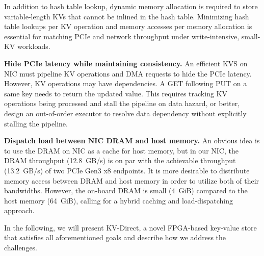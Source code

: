 In addition to hash table lookup, dynamic memory allocation is required to store variable-length KVs that cannot be inlined in the hash table.
Minimizing hash table lookups per KV operation and memory accesses per memory allocation is essential for matching PCIe and network throughput under write-intensive, small-KV workloads.

\textbf{Hide PCIe latency while maintaining consistency.}
An efficient KVS on NIC must pipeline KV operations and DMA requests to hide the PCIe latency.
However, KV operations may have dependencies.
A GET following PUT on a same key needs to return the updated value.
This requires tracking KV operations being processed and stall the pipeline on data hazard, or better, design an out-of-order executor to resolve data dependency without explicitly stalling the pipeline.


\textbf{Dispatch load between NIC DRAM and host memory.}
An obvious idea is to use the DRAM on NIC as a cache for host memory, but in our NIC, the DRAM throughput (12.8~GB/s) is on par with the achievable throughput (13.2~GB/s) of two PCIe Gen3 x8 endpoints.
It is more desirable to distribute memory access between DRAM and host memory in order to utilize both of their bandwidths.
However, the on-board DRAM is small (4~GiB) compared to the host memory (64~GiB), calling for a hybrid caching and load-dispatching approach.

In the following, we will present KV-Direct, a novel FPGA-based key-value store that satisfies all aforementioned goals and describe how we address the challenges.
